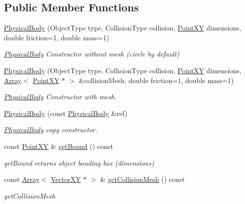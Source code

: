 \subsection*{Public Member Functions}
\begin{DoxyCompactItemize}
\item 
\hyperlink{classPhysicalBody_a32ddf45baf5694a3cc6c405e2ed6e7bf}{Physical\+Body} (Object\+Type type, Collision\+Type collision, \hyperlink{classPointXY}{Point\+X\+Y} dimensions, double friction=1, double mass=1)
\begin{DoxyCompactList}\small\item\em \hyperlink{classPhysicalBody}{Physical\+Body} Constructor without mesh (circle by default) \end{DoxyCompactList}\item 
\hyperlink{classPhysicalBody_ab4285ad124f8e4ed0c9c7fd05fad9268}{Physical\+Body} (Object\+Type type, Collision\+Type collision, \hyperlink{classPointXY}{Point\+X\+Y} dimensions, \hyperlink{classArray}{Array}$<$ \hyperlink{classPointXY}{Point\+X\+Y} $\ast$ $>$ \&collision\+Mesh, double friction=1, double mass=1)
\begin{DoxyCompactList}\small\item\em \hyperlink{classPhysicalBody}{Physical\+Body} Constructor with mesh. \end{DoxyCompactList}\item 
\hyperlink{classPhysicalBody_abfe0f525e4934d83216525a84c9c69f7}{Physical\+Body} (const \hyperlink{classPhysicalBody}{Physical\+Body} \&ref)
\begin{DoxyCompactList}\small\item\em \hyperlink{classPhysicalBody}{Physical\+Body} copy constructor. \end{DoxyCompactList}\item 
const \hyperlink{classPointXY}{Point\+X\+Y} \& \hyperlink{classPhysicalBody_a548eed7049c86fbc46ae96958c8703d7}{get\+Bound} () const 
\begin{DoxyCompactList}\small\item\em get\+Bound returns object bouding box (dimensions) \end{DoxyCompactList}\item 
const \hyperlink{classArray}{Array}$<$ \hyperlink{classVectorXY}{Vector\+X\+Y} $\ast$ $>$ \& \hyperlink{classPhysicalBody_ac2166b0723886ce7f9c040e18ec954c6}{get\+Collision\+Mesh} () const 
\begin{DoxyCompactList}\small\item\em get\+Collision\+Mesh \end{DoxyCompactList}\item 

\end{DoxyCompactItemize}
